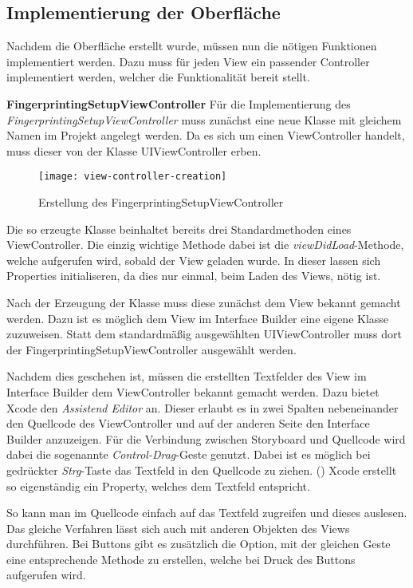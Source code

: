 \subsection{Implementierung der Oberfläche}
\label{sec:}

Nachdem die Oberfläche erstellt wurde, müssen nun die nötigen Funktionen implementiert werden. 
Dazu muss für jeden View ein passender Controller implementiert werden, welcher die Funktionalität bereit stellt.


\textbf{FingerprintingSetupViewController}
Für die Implementierung des \emph{FingerprintingSetupViewController} muss zunächst eine neue Klasse mit gleichem Namen im Projekt angelegt werden. 
Da es sich um einen ViewController handelt, muss dieser von der Klasse UIViewController erben.

\begin{figure}[htb!]
		\centering
	\texttt{[image: view-controller-creation]}
	\caption{Erstellung des FingerprintingSetupViewController}
	\label{view-controller-creation}
\end{figure}

Die so erzeugte Klasse beinhaltet bereits drei Standardmethoden eines ViewController. Die einzig wichtige Methode dabei ist die \emph{viewDidLoad}-Methode, welche aufgerufen wird, sobald der View geladen wurde. In dieser lassen sich Properties initialiseren, da dies nur einmal, beim Laden des Views, nötig ist.
 
Nach der Erzeugung der Klasse muss diese zunächst dem View bekannt gemacht werden. Dazu ist es möglich dem View im Interface Builder eine eigene Klasse zuzuweisen. Statt dem standardmäßig ausgewählten UIViewController muss dort der FingerprintingSetupViewController ausgewählt werden.

Nachdem dies geschehen ist, müssen die erstellten Textfelder des View im Interface Builder dem ViewController bekannt gemacht werden. Dazu bietet Xcode den \emph{Assistend Editor} an. Dieser erlaubt es in zwei Spalten nebeneinander den Quellcode des ViewController und auf der anderen Seite den Interface Builder anzuzeigen. Für die Verbindung zwischen Storyboard und Quellcode wird dabei die sogenannte \emph{Control-Drag}-Geste genutzt. Dabei ist es möglich bei gedrückter \emph{Strg}-Taste das Textfeld in den Quellcode zu ziehen. (\cite{cntrldrag})
Xcode erstellt so eigenständig ein Property, welches dem Textfeld entspricht.

So kann man im Quellcode einfach auf das Textfeld zugreifen und dieses auslesen. Das gleiche Verfahren lässt sich auch mit anderen Objekten des Views durchführen. Bei Buttons gibt es zusätzlich die Option, mit der gleichen Geste eine entsprechende Methode zu erstellen, welche bei Druck des Buttons aufgerufen wird.

